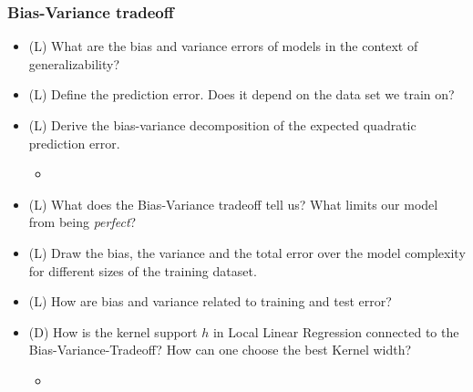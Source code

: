 \subsubsection*{Bias-Variance tradeoff}
\begin{itemize}
    \item (L) What are the bias and variance errors of models in the context of generalizability?
    \item (L) Define the prediction error. Does it depend on the data set we train on?
    \item (L) Derive the bias-variance decomposition of the expected quadratic prediction error.
    \begin{itemize}
        \item {}
    \end{itemize}
    \item (L) What does the Bias-Variance tradeoff tell us? What limits our model from being \textit{perfect}?
    \item (L) Draw the bias, the variance and the total error over the model complexity for different sizes of the training dataset.
    \item (L) How are bias and variance related to training and test error?
    \item (D) How is the kernel support $h$ in Local Linear Regression connected to the Bias-Variance-Tradeoff? How can one choose the best Kernel width?
    \begin{itemize}
        \item {}
    \end{itemize}
\end{itemize}

